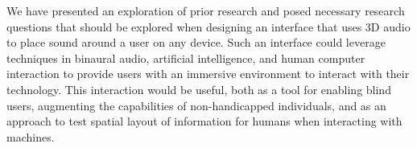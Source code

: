 We have presented an exploration of prior research and posed necessary research
questions that should be explored when designing an interface that uses 3D audio
to place sound around a user on any device. Such an interface could leverage
techniques in binaural audio, artificial intelligence, and human computer 
interaction to provide users with an immersive environment to interact with 
their technology. This interaction would be useful, both as a tool
for enabling blind users, augmenting the capabilities of non-handicapped
individuals, and as an approach to test spatial layout of information 
for humans when interacting with machines.


\newpage                                                  {}


